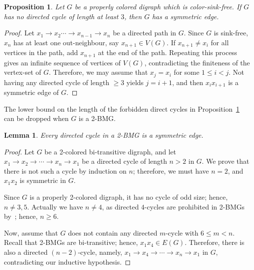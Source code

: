 \documentclass[final,3p,times]{elsarticle}
\newtheorem{proposition}[theorem]{Proposition}%
\newtheorem{lemma}[theorem]{Lemma}%
\begin{document}
\begin{proposition}
\label{prop:sink-free_sym}
Let $G$ be a properly colored digraph which is color-sink-free. If $G$ has no directed cycle of length at least $3$, then $G$ has a symmetric edge.
\end{proposition}
\begin{proof} 
Let $x_1\rightarrow x_2\cdots\rightarrow x_{n-1}\rightarrow x_n$ be a directed path in $G$. Since $G$ is sink-free, $x_n$ has at least one out-neighbour, say $x_{n+1}\in V(G)$. If $x_{n+1}\neq x_i$ for all vertices in the path, add $x_{n+1}$ at the end of the path. Repeating this process gives an infinite sequence of vertices of $V(G)$, contradicting the finiteness of the vertex-set of $G$. Therefore, we may assume that $x_j=x_i$ for some $1\leq i<j$. Not having any directed cycle of length $\ge 3$ yields $j=i+1$, and then $x_i x_{i+1}$ is a symmetric edge of $G$.
\end{proof}

The lower bound on the length of the forbidden direct cycles in Proposition~\ref{prop:sink-free_sym} can be dropped when $G$ is a 2-BMG.

\begin{lemma}
\label{lemma:2BMG-sym}
Every directed cycle in a 2-BMG is a symmetric edge.
\end{lemma}
\begin{proof}
Let $G$ be a 2-colored bi-transitive digraph, and let $x_1\rightarrow x_2\rightarrow \cdots \rightarrow x_{n} \rightarrow x_1$ be a directed cycle of length $n>2$ in $G$. We prove that there is not such a cycle by induction on $n$; therefore, we must have $n=2$, and $x_1x_2$ is symmetric in $G$.

Since $G$ is a properly 2-colored digraph, it has no cycle of odd size; hence, $n\neq3,5$. Actually we have $n\neq4$, as directed $4$-cycles are prohibited in 2-BMGs by~\cite[Corollary~3.6]{schaller2021complexity}; hence, $n\geq 6$.

Now, assume that $G$ does not contain any directed $m$-cycle with $6\leq m<n$. Recall that 2-BMGs are bi-transitive; hence, $x_1x_4\in E(G)$. Therefore, there is also a directed $(n-2)$-cycle, namely, $x_1\rightarrow x_4\rightarrow \cdots \rightarrow x_{n} \rightarrow x_1$ in $G$, contradicting our inductive hypothesis.
\end{proof}
\end{document}

